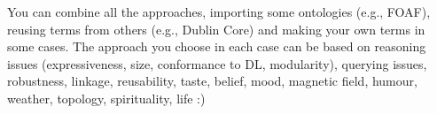 \begin{itemize}
\begin{enumerate}
	\end{enumerate}
		You can combine all the approaches, importing some ontologies (e.g., FOAF), reusing terms from others (e.g., Dublin Core) and making your own terms in some cases. The approach you choose in each case can be based on reasoning issues (expressiveness, size, conformance to DL, modularity), querying issues, robustness, linkage, reusability, taste, belief, mood, magnetic field, humour, weather, topology, spirituality, life :)
\end{itemize}


